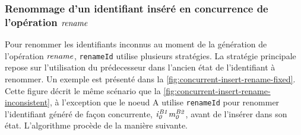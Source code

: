 \subsubsection{Renommage d'un identifiant inséré en concurrence de l'opération $\mathit{rename}$}
\label{sec:renameId-id-not-in-former-state}

Pour renommer les identifiants inconnus au moment de la génération de l'opération $\mathit{rename}$, \texttt{renameId} utilise plusieurs stratégies.
La stratégie principale repose sur l'utilisation du prédecesseur dans l'ancien état de l'identifiant à renommer.
Un exemple est présenté dans la \autoref{fig:concurrent-insert-rename-fixed}.
Cette figure décrit le même scénario que la \autoref{fig:concurrent-insert-rename-inconsistent}, à l'exception que le noeud A utilise \texttt{renameId} pour renommer l'identifiant généré de façon concurrente, $\mathit{i}^{\mathit{B1}}_{\mathit{0}}\mathit{m}^{\mathit{B2}}_{\mathit{0}}$, avant de l'insérer dans son état.
L'algorithme procède de la manière suivante.

